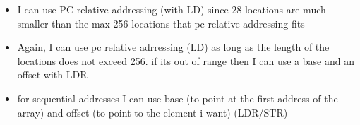 \documentclass[10pt,answers]{exam}
\begin{document}
\begin{questions}
\begin{solution}
    \begin{itemize}
	\item I can use PC-relative addressing (with LD) since 28 locations are much smaller than the max 256 locations that pc-relative addressing fits
	\item Again, I can use pc relative adrressing (LD) as long as the length of the locations does not exceed 256. if its out of range then I can use a base and an offset with LDR
	\item for sequential addresses I can use base (to point at the first address of the array) and offset (to point to the element i want) (LDR/STR) 
	\end{itemize}
\end{solution}


\end{questions}
\end{document}
